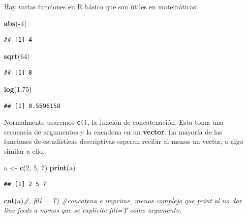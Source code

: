 \documentclass[
]{article}
\newenvironment{Shaded}{\begin{snugshade}}{\end{snugshade}}
\newcommand{\CommentTok}[1]{\textcolor[rgb]{0.56,0.35,0.01}{\textit{#1}}}
\newcommand{\DecValTok}[1]{\textcolor[rgb]{0.00,0.00,0.81}{#1}}
\newcommand{\FloatTok}[1]{\textcolor[rgb]{0.00,0.00,0.81}{#1}}
\newcommand{\FunctionTok}[1]{\textcolor[rgb]{0.13,0.29,0.53}{\textbf{#1}}}
\newcommand{\NormalTok}[1]{#1}
\newcommand{\OtherTok}[1]{\textcolor[rgb]{0.56,0.35,0.01}{#1}}
\newcommand{\SpecialCharTok}[1]{\textcolor[rgb]{0.81,0.36,0.00}{\textbf{#1}}}
\begin{document}
Hay varias funciones en R básico que son útiles en matemáticas:

\begin{Shaded}
\begin{Highlighting}[]
\FunctionTok{abs}\NormalTok{(}\SpecialCharTok{{-}}\DecValTok{4}\NormalTok{)}
\end{Highlighting}
\end{Shaded}

\begin{verbatim}
## [1] 4
\end{verbatim}

\begin{Shaded}
\begin{Highlighting}[]
\FunctionTok{sqrt}\NormalTok{(}\DecValTok{64}\NormalTok{)}
\end{Highlighting}
\end{Shaded}

\begin{verbatim}
## [1] 8
\end{verbatim}

\begin{Shaded}
\begin{Highlighting}[]
\FunctionTok{log}\NormalTok{(}\FloatTok{1.75}\NormalTok{)}
\end{Highlighting}
\end{Shaded}

\begin{verbatim}
## [1] 0.5596158
\end{verbatim}

Normalmente usaremos \texttt{c()}, la función de concatenación. Esta
toma una secuencia de argumentos y la encadena en un \textbf{vector}. La
mayoría de las funciones de estadísticas descriptivas esperan recibir al
menos un vector, o algo similar a ello.

\begin{Shaded}
\begin{Highlighting}[]
\NormalTok{a }\OtherTok{\textless{}{-}} \FunctionTok{c}\NormalTok{(}\DecValTok{2}\NormalTok{, }\DecValTok{5}\NormalTok{, }\DecValTok{7}\NormalTok{)}
\FunctionTok{print}\NormalTok{(a)}
\end{Highlighting}
\end{Shaded}

\begin{verbatim}
## [1] 2 5 7
\end{verbatim}

\begin{Shaded}
\begin{Highlighting}[]
\FunctionTok{cat}\NormalTok{(a)}\CommentTok{\#, fill = T) \#concatena e imprime, menos complejo que print al no dar line feeds a menos que se explicite fill=T como argumento.}
\end{Highlighting}
\end{Shaded}
\end{document}
